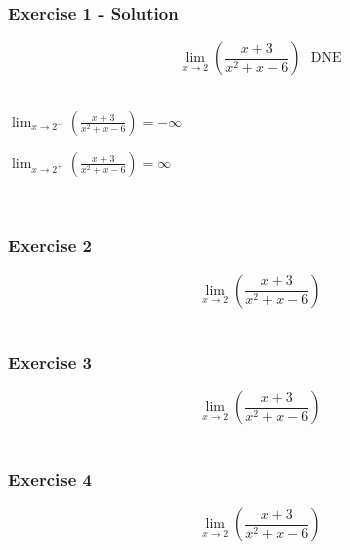 \documentclass[12pt]{beamer}
\begin{document}
\begin{frame}
	\frametitle{Exercise 1 - Solution}
	\vspace*{\fill}
	\initclock
	\Large
	\[\displaystyle\lim_{x\to2}\left(\frac{x+3}{x^2+x-6}\right) \text{ }\boxed{\text{DNE}}\]\\
	\small
	\vspace*{\fill}
	\vspace*{\fill}
	\begin{minipage}{0.5\textwidth}
		$\displaystyle\lim_{x\to2^{-}}\left(\frac{x+3}{x^2+x-6}\right)=-\infty$
	\end{minipage}%
	\begin{minipage}{0.5\textwidth}
		$\displaystyle\lim_{x\to2^{+}}\left(\frac{x+3}{x^2+x-6}\right)=\infty$
	\end{minipage}\\
	\vspace*{\fill}
	\vspace*{\fill}
	\crono
\end{frame}
\begin{frame}
	\frametitle{Exercise 2}
	\vspace*{\fill}
	\vspace*{\fill}
	\vspace*{\fill}
	\initclock
	\Large
	\[\displaystyle\lim_{x\to2}\left(\frac{x+3}{x^2+x-6}\right)\]\\
	\vspace*{\fill}
	\vspace*{\fill}
	\vspace*{\fill}
	\vspace*{\fill}
	\crono
\end{frame}

\begin{frame}
	\frametitle{Exercise 3}
	\vspace*{\fill}
	\vspace*{\fill}
	\vspace*{\fill}
	\initclock
	\Large
	\[\displaystyle\lim_{x\to2}\left(\frac{x+3}{x^2+x-6}\right)\]\\
	\vspace*{\fill}
	\vspace*{\fill}
	\vspace*{\fill}
	\vspace*{\fill}
	\crono
\end{frame}

\begin{frame}
	\frametitle{Exercise 4}
	\vspace*{\fill}
	\vspace*{\fill}
	\vspace*{\fill}
	\initclock
	\Large
	\[\displaystyle\lim_{x\to2}\left(\frac{x+3}{x^2+x-6}\right)\]\\
	\vspace*{\fill}
	\vspace*{\fill}
	\vspace*{\fill}
	\vspace*{\fill}
	\crono
\end{frame}
\end{document}
